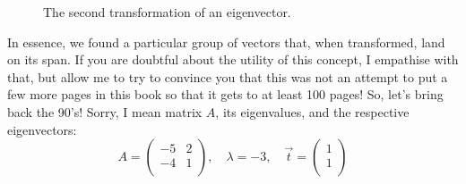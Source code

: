 \documentclass[600paper, 11pt,twoside,openany]{kdp}
\begin{document}
\begin{figure}[h!]
\begin{center}
\end{center}
\caption{The second transformation of an eigenvector.}
\end{figure}
\indent In essence, we found a particular group of vectors that, when transformed, land on its span. If you are doubtful about the utility of this concept, I empathise with that, but allow me to try to convince you that this was not an attempt to put a few more pages in this book so that it gets to at least 100 pages! So, let’s bring back the 90’s! Sorry, I mean matrix $A$, its eigenvalues, and the respective eigenvectors:
\[ A = \begin{pmatrix}
-5 & 2  \\
-4 & 1 \\
\end{pmatrix},\quad \lambda = -3,  \quad  \overrightarrow{t} = \begin{pmatrix}
1  \\
1 \\ \end{pmatrix} \]
\end{document}
